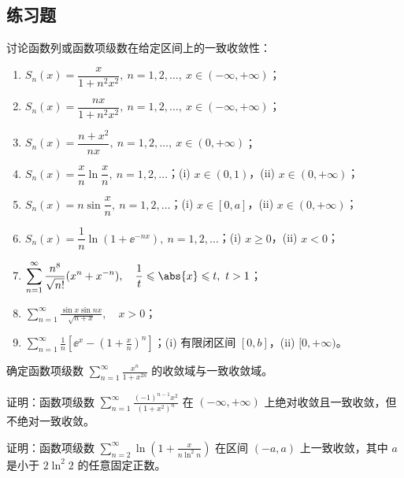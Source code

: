 \subsection{练习题}

\begin{xexercise}[1]
讨论函数列或函数项级数在给定区间上的一致收敛性：
  \begin{enumerate}[label=(\arabic*)]
    \item $S_n(x)=\dfrac{x}{1+n^2x^2},\ n=1,2,\ldots,\ x\in(-\infty,+\infty)$；
    \item $S_n(x)=\dfrac{nx}{1+n^2x^2},\ n=1,2,\ldots,\ x\in(-\infty,+\infty)$；
    \item $S_n(x)=\dfrac{n+x^2}{nx},\ n=1,2,\ldots,\ x\in(0,+\infty)$；
    \item $S_n(x)=\dfrac{x}{n}\ln\dfrac{x}{n},\ n=1,2,\ldots$；(i) $x\in(0,1)$，(ii) $x\in(0,+\infty)$；
    \item $S_n(x)=n\sin\dfrac{x}{n},\ n=1,2,\ldots$；(i) $x\in[0,a]$，(ii) $x\in(0,+\infty)$；
    \item $S_n(x)=\dfrac1n\ln(1+\ee^{-nx}),\ n=1,2,\ldots$；(i) $x\geqslant0$，(ii) $x<0$；
    \item $\displaystyle\sum_{n=1}^{\infty}\frac{n^8}{\sqrt{n!}}(x^n+x^{-n}),\quad \frac1t\leqslant\abs{x}\leqslant t,\ t>1$；
    \item $\displaystyle\sum_{n=1}^{\infty}\frac{\sin x\sin nx}{\sqrt{n+x}},\quad x>0$；
    \item $\displaystyle\sum_{n=1}^{\infty}\frac1n\left[\ee^x-\left(1+\frac{x}{n}\right)^n\right]$；(i) 有限闭区间 $[0,b]$，(ii) $[0,+\infty)$。
  \end{enumerate}
\end{xexercise}

\begin{xexercise}[2]
确定函数项级数 $\displaystyle\sum_{n=1}^{\infty}\frac{x^n}{1+x^{2n}}$ 的收敛域与一致收敛域。
\end{xexercise}

\begin{xexercise}[3]
证明：函数项级数 $\displaystyle\sum_{n=1}^{\infty}\frac{(-1)^{n-1}x^2}{(1+x^2)^n}$ 在 $(-\infty,+\infty)$ 上绝对收敛且一致收敛，但不绝对一致收敛。
\end{xexercise}

\begin{xexercise}[4]
证明：函数项级数 $\displaystyle\sum_{n=2}^{\infty}\ln\left(1+\frac{x}{n\ln^2n}\right)$ 在区间 $(-a,a)$ 上一致收敛，其中 $a$ 是小于 $2\ln^2 2$ 的任意固定正数。
\end{xexercise}

